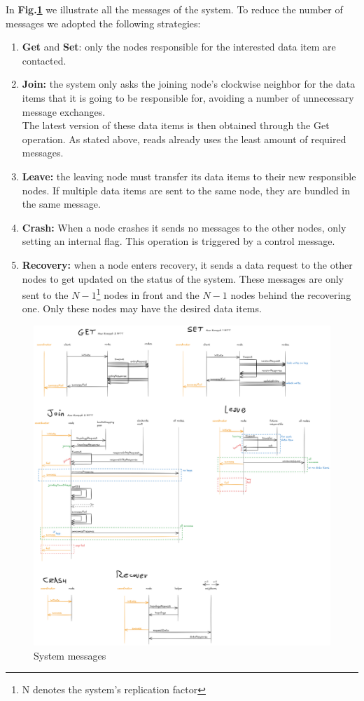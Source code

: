 \documentclass{article}
\begin{document}
In \textbf{Fig.\ref{fig:messages}} we illustrate all the messages of the 
system. To reduce the number of messages we adopted the following strategies:
\begin{enumerate}
    \item \textbf{Get} and \textbf{Set}: only the nodes responsible for the 
    interested data item are contacted.
    \item \textbf{Join:} the system only asks the joining node's clockwise 
    neighbor for the data items that it is going to be responsible for, 
    avoiding a number of unnecessary message exchanges.\\
        The latest version of these data items is then obtained through the 
        Get operation. As stated above, reads already uses the least 
        amount of required messages.
    \item \textbf{Leave:} the leaving node must transfer its data items to their 
    new responsible nodes. If multiple data items are sent to the same node, 
    they are bundled in the same message.
    \item \textbf{Crash:} When a node crashes it sends no messages to the 
    other nodes, only setting an internal flag. This operation is triggered 
    by a control message.
    \item \textbf{Recovery:} when a node enters recovery, it sends a data 
    request to the other nodes to get updated on the status of the system. 
    These messages are only sent to the $N-1$\footnote{N denotes the system's 
    replication factor} nodes in front and the $N-1$ nodes behind the recovering 
    one. Only these nodes may have the desired data items.
\end{enumerate}

\begin{figure}
    \centering
    \includegraphics[width=1\linewidth]{images/messages.png}
    \caption{System messages}
    \label{fig:messages}
\end{figure}
\end{document}
